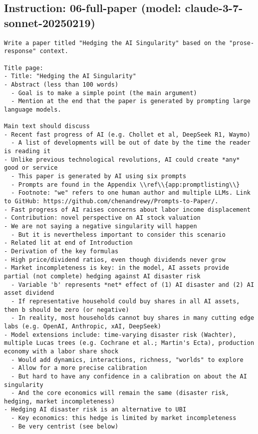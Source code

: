 \subsection*{Instruction: 06-full-paper  (model: claude-3-7-sonnet-20250219)}
\vspace{-1ex}
\begin{lstlisting}[language=text,breaklines=true,frame=single]
Write a paper titled "Hedging the AI Singularity" based on the "prose-response" context.

Title page:
- Title: "Hedging the AI Singularity"  
- Abstract (less than 100 words)
  - Goal is to make a simple point (the main argument)
  - Mention at the end that the paper is generated by prompting large language models.

Main text should discuss
- Recent fast progress of AI (e.g. Chollet et al, DeepSeek R1, Waymo)
  - A list of developments will be out of date by the time the reader is reading it
- Unlike previous technological revolutions, AI could create *any* good or service
  - This paper is generated by AI using six prompts 
  - Prompts are found in the Appendix \\ref\\{app:promptlisting\\}
  - Footnote: "we" refers to one human author and multiple LLMs. Link to GitHub: https://github.com/chenandrewy/Prompts-to-Paper/.
- Fast progress of AI raises concerns about labor income displacement
- Contribution: novel perspective on AI stock valuation        
- We are not saying a negative singularity will happen
  - But it is nevertheless important to consider this scenario        
- Related lit at end of Introduction
- Derivation of the key formulas
- High price/dividend ratios, even though dividends never grow
- Market incompleteness is key: in the model, AI assets provide partial (not complete) hedging against AI disaster risk
  - Variable 'b' represents *net* effect of (1) AI disaster and (2) AI asset dividend
  - If representative household could buy shares in all AI assets, then b should be zero (or negative)
  - In reality, most households cannot buy shares in many cutting edge labs (e.g. OpenAI, Anthropic, xAI, DeepSeek)
- Model extensions include: time-varying disaster risk (Wachter), multiple Lucas trees (e.g. Cochrane et al.; Martin's Ecta), production economy with a labor share shock
  - Would add dynamics, interactions, richness, "worlds" to explore 
  - Allow for a more precise calibration
  - But hard to have any confidence in a calibration on about the AI singularity
  - And the core economics will remain the same (disaster risk, hedging, market incompleteness)
- Hedging AI disaster risk is an alternative to UBI
  - Key economics: this hedge is limited by market incompleteness
  - Be very centrist (see below)


\end{lstlisting}
